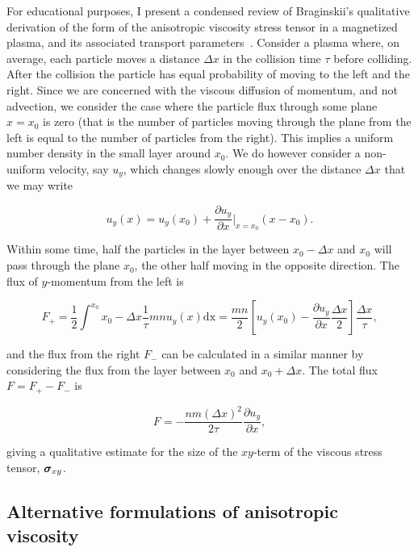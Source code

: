 For educational purposes, I present a condensed review of Braginskii's qualitative derivation of the form of the anisotropic viscosity stress tensor in a magnetized plasma, and its associated transport parameters~\cite{braginskiiTransportProcessesPlasma1965}. Consider a plasma where, on average, each particle moves a distance $\Delta x$ in the collision time $\tau$ before colliding. After the collision the particle has equal probability of moving to the left and the right. Since we are concerned with the viscous diffusion of momentum, and not advection, we consider the case where the particle flux through some plane $x=x_0$ is zero (that is the number of particles moving through the plane from the left is equal to the number of particles from the right). This implies a uniform number density in the small layer around $x_0$. We do however consider a non-uniform velocity, say $u_y$, which changes slowly enough over the distance $\Delta x$ that we may write

\begin{equation}
  \label{eq:viscous_derivation_vy}
u_y (x) = u_y(x_0) + \frac{\partial u_y}{\partial x} |_{x=x_0} (x - x_0).
\end{equation}

Within some time, half the particles in the layer between $x_0 - \Delta x$ and $x_0$ will pass through the plane $x_0$, the other half moving in the opposite direction. The flux of $y$-momentum from the left is

\begin{equation}
  \label{eq:momentum_flux_left}
F_{+} = \frac{1}{2} \int^{x_0}{x_0 - \Delta x} \frac{1}{\tau} m n u_y(x) \text{dx} = \frac{mn}{2} \left[ u_y(x_0) - \frac{\partial u_y}{\partial x} \frac{\Delta x}{2} \right] \frac{\Delta x}{\tau},
\end{equation}

and the flux from the right $F_{-}$ can be calculated in a similar manner by considering the flux from the layer between $x_0$ and $x_0 + \Delta x$. The total flux $F = F_+ - F_-$ is

\begin{equation}
  \label{eq:total_momentum_flux}
  F = - \frac{nm(\Delta x)^2}{2\tau} \frac{\partial u_y}{\partial x},
\end{equation}

giving a qualitative estimate for the size of the $xy$-term of the viscous stress tensor, ${\bm \sigma}_{xy}$. 

\subsection{Alternative formulations of anisotropic viscosity}

